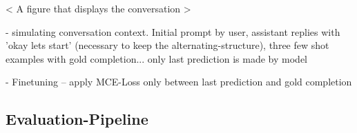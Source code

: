 \documentclass{article}
\begin{document}
< A figure that displays the conversation >

- simulating conversation context. Initial prompt by user, assistant replies with 'okay lets start' (necessary to keep the alternating-structure), three few shot examples with gold completion... only last prediction is made by model

- Finetuning
-- apply MCE-Loss only between last prediction and gold completion 

\subsection{Evaluation-Pipeline}










\end{document}
